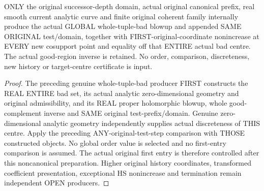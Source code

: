 \begin{theorem}
\label{hir:original-curve-whole-bad-preparation-first-entry-producer}
\leanok
ONLY the original successor-depth domain, actual original canonical prefix,
real smooth current analytic curve and finite original coherent family
internally produce the actual GLOBAL whole-tuple-bad blowup and appended
SAME ORIGINAL test/domain, together with FIRST-original-coordinate
nonincrease at EVERY new cosupport point and equality off that ENTIRE
actual bad centre. The actual good-region inverse is retained. No order,
comparison, discreteness, new history or target-centre certificate is input.
\end{theorem}
\begin{proof}
The preceding genuine whole-tuple-bad producer FIRST constructs the REAL
ENTIRE bad set, its actual analytic zero-dimensional geometry and original
admissibility, and its REAL proper holomorphic blowup, whole good-complement
inverse and SAME original test-prefix/domain. Genuine zero-dimensional
analytic geometry independently supplies actual discreteness of THIS
centre. Apply the preceding ANY-original-test-step comparison with THOSE
constructed objects. No global order value is selected and no first-entry
comparison is assumed. The actual original first entry is therefore
controlled after this noncanonical preparation. Higher original history
coordinates, transformed coefficient presentation, exceptional HS
nonincrease and termination remain independent OPEN producers.
\end{proof}
